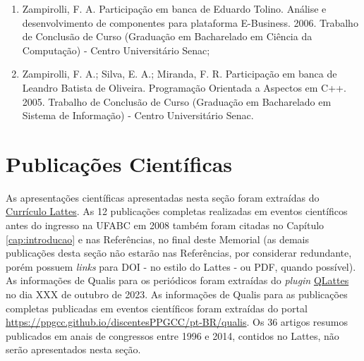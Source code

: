 \begin{enumerate}
    \item Zampirolli, F. A. Participação em banca de Eduardo Tolino. Análise e desenvolvimento de componentes para plataforma E-Business. 2006. Trabalho de Conclusão de Curso (Graduação em Bacharelado em Ciência da Computação) - Centro Universitário Senac;
    \item Zampirolli, F. A.; Silva, E. A.; Miranda, F. R. Participação em banca de Leandro Batista de Oliveira. Programação Orientada a Aspectos em C++. 2005. Trabalho de Conclusão de Curso (Graduação em Bacharelado em Sistema de Informação) - Centro Universitário Senac.
\end{enumerate}




\section{Publicações Científicas}

As apresentações científicas apresentadas nesta seção foram extraídas do \href{http://www.google.com/url?q=http%3A%2F%2Flattes.cnpq.br%2F4127260763254001&sa=D&sntz=1&usg=AOvVaw1HddQQ8MGMUNyg9ZdkRNak}{Currículo Lattes}. As 12 publicações completas realizadas em eventos científicos antes do ingresso na UFABC em 2008 também foram citadas no Capítulo \ref{cap:introducao} e nas Referências, no final deste Memorial (as demais publicações desta seção não estarão nas Referências, por considerar redundante, porém possuem \textit{links} para DOI - no estilo do Lattes - ou PDF, quando possível). As informações de Qualis para os periódicos foram extraídas do \textit{plugin} \href{chrome-extension://cobekobjpobenpjdggbpkkklkcfoinen/html/options.html}{QLattes} {\color{red} no dia XXX de outubro de 2023}. As informações de Qualis para as publicações completas publicadas em eventos científicos foram extraídas do portal \url{https://ppgcc.github.io/discentesPPGCC/pt-BR/qualis}. Os 36 artigos resumos publicados em anais de congressos entre 1996 e 2014, contidos no Lattes, não serão apresentados nesta seção.



